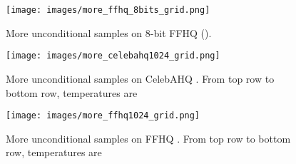 \documentclass{article}
\begin{document}
\begin{figure}[!htb]
    \centering
    \texttt{[image: images/more\_ffhq\_8bits\_grid.png]}
    \caption{More unconditional samples on 8-bit FFHQ  ().}
    \label{more_ffhq256_8bits_fig}
\end{figure}

\begin{figure}[!htb]
    \centering
    \texttt{[image: images/more\_celebahq1024\_grid.png]}
    \caption{More unconditional samples on CelebAHQ . From top row to bottom row, temperatures are }
    \label{more_celebahq1024_fig}
\end{figure}

\begin{figure}[!htb]
    \centering
    \texttt{[image: images/more\_ffhq1024\_grid.png]}
    \caption{More unconditional samples on FFHQ . From top row to bottom row, temperatures are }
    \label{more_ffhq1024_fig}
\end{figure}
\end{document}
